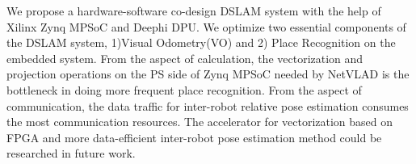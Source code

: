 \label{sec:conclusion} 

We propose a hardware-software co-design DSLAM system with the help of Xilinx Zynq MPSoC and Deephi DPU. We optimize two essential components of the DSLAM system,  1)Visual Odometry(VO) and 2) Place Recognition on the embedded system. From the aspect of calculation, the vectorization and projection operations on the PS side of Zynq MPSoC needed by NetVLAD is the bottleneck in doing more frequent place recognition. From the aspect of communication, the data traffic for inter-robot relative pose estimation consumes the most communication resources. The accelerator for vectorization based on FPGA and more data-efficient inter-robot pose estimation method could be researched in future work.